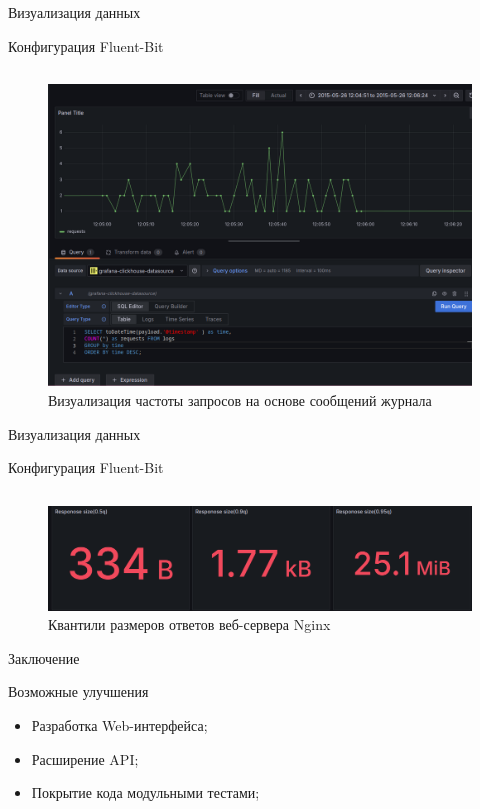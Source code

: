 \documentclass{beamer}
\begin{document}
\begin{frame}{Визуализация данных}
	\begin{listing}[H]
		\caption{Конфигурация Fluent-Bit}
		\inputminted[style=bw, frame=single,fontsize = \small, linenos=true, xleftmargin = 1.5em, breaklines=true]{sql}{./listings/grafana_nginx_requests.sql}
	\end{listing}

	\begin{figure}[H]
		\centering
		\includegraphics[width=.5\textwidth]{./imgs/nginx_grafana_requests.png}
		\caption{Визуализация частоты запросов на основе сообщений журнала}
	\end{figure}

\end{frame}

\begin{frame}{Визуализация данных}
	\begin{listing}[H]
		\caption{Конфигурация Fluent-Bit}
		\inputminted[style=bw, frame=single,fontsize = \small, linenos=true, xleftmargin = 1.5em, breaklines=true]{sql}{./listings/quantiles.sql}
	\end{listing}

	\begin{figure}[H]
		\centering
		\includegraphics[width=.7\textwidth]{./imgs/nginx_grafana_size_quantilie.png}
		\caption{Квантили размеров ответов веб-сервера Nginx}
	\end{figure}
\end{frame}


\begin{frame}{Заключение}
	\begin{alertblock}{Возможные улучшения}
		\begin{itemize}
			\item Разработка Web-интерфейса;
			\item Расширение API;
			\item Покрытие кода модульными тестами;
		\end{itemize}
	\end{alertblock}
\end{frame}
\end{document}
